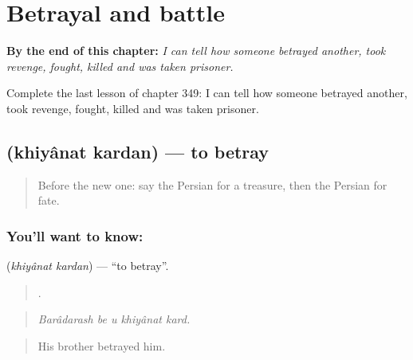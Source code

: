 
\chapter{Betrayal and battle}
\label{ch:fa-betrayal-and-battle}

\begin{chapteropening}
\textbf{By the end of this chapter:} \emph{I can tell how someone betrayed another, took revenge, fought, killed and was taken prisoner.}

Complete the last lesson of chapter 349: I can tell how someone betrayed another, took revenge, fought, killed and was taken prisoner.
\end{chapteropening}

\section[\texorpdfstring{\fa{خیانت} \fa{کردن} (khiyânat kardan)}{خیانت کردن (khiyânat kardan)}]{  (khiyânat kardan) — to betray}

\label{lesson:FA-C349-khiyanat-kardan}



\begin{quote}
Before the new one: say the Persian for a treasure, then the Persian for fate.
\end{quote}

\subsection*{You'll want to know:  }
\textbf{ } (\emph{khiyânat kardan}) — \textquotedblleft{}to betray\textquotedblright{}.

\begin{quote}
    .
\end{quote}

\begin{quote}
\emph{Barâdarash be u khiyânat kard.}
\end{quote}

\begin{quote}
His brother betrayed him.
\end{quote}

